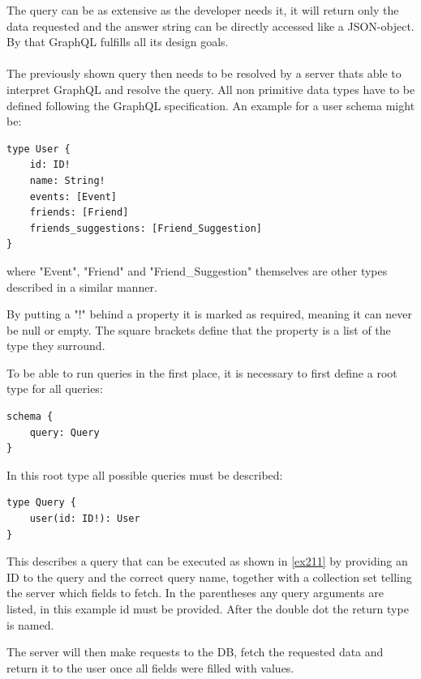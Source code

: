 The query can be as extensive as the developer needs it, it will return only the data requested and the answer string can be directly accessed like a JSON-object. By that GraphQL fulfills all its design goals.
\\ \\
The previously shown query then needs to be resolved by a server thats able to interpret GraphQL and resolve the query. All non primitive data types have to be defined following the GraphQL specification. An example for a user schema might be:

\begin{lstlisting}[caption={Type Definition in GraphQL}]
type User {
	id: ID! 
	name: String! 
	events: [Event] 
	friends: [Friend] 
	friends_suggestions: [Friend_Suggestion] 
}
\end{lstlisting}

\noindent
where "Event", "Friend" and "Friend\_Suggestion" themselves are other types described in a similar manner.

By putting a "!" behind a property it is marked as required, meaning it can never be null or empty. The square brackets define that the property is a list of the type they surround.

To be able to run queries in the first place, it is necessary to first define a root type for all queries:

\begin{lstlisting}[caption={Root Type Definition}]
schema {
	query: Query
}
\end{lstlisting}

In this root type all possible queries must be described:

\begin{lstlisting}[caption={Defining Queries}]
type Query { 
	user(id: ID!): User 
}
\end{lstlisting}

This describes a query that can be executed as shown in \autoref{ex211} by providing an ID to the query and the correct query name, together with a collection set telling the server which fields to fetch. In the parentheses any query arguments are listed, in this example id must be provided. After the double dot the return type is named. 

The server will then make requests to the DB, fetch the requested data and return it to the user once all fields were filled with values.


